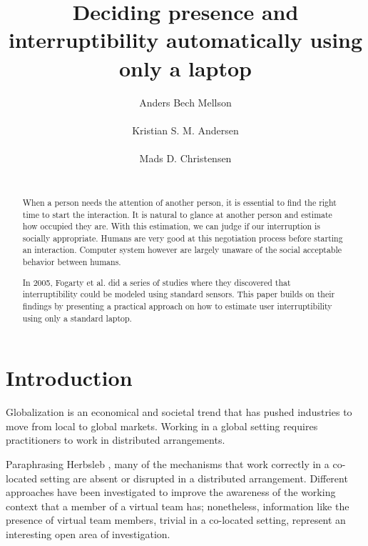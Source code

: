 \documentclass{sigchi}
\begin{document}
\title{Deciding presence and interruptibility automatically using only a laptop}
\author{
  \alignauthor Anders Bech Mellson\\
    \\
  \alignauthor Kristian S. M. Andersen\\
    \\
  \alignauthor Mads D. Christensen\\
    \\
}

\maketitle

\begin{abstract}
When a person needs the attention of another person, it is essential to find the right time to start the interaction.
It is natural to glance at another person and estimate how occupied they are. With this estimation, we can judge if our interruption is socially appropriate.
Humans are very good at this negotiation process before starting an interaction.
Computer system however are largely unaware of the social acceptable behavior between humans.

In 2005, Fogarty et al. did a series of studies where they discovered that interruptibility could be modeled using standard sensors.
This paper builds on their findings by presenting a practical approach on how to estimate user interruptibility using only a standard laptop.

\end{abstract}



\section{Introduction}
Globalization is an economical and societal trend that has pushed industries to move from local to global markets.
Working in a global setting requires practitioners to work in distributed arrangements.

Paraphrasing Herbsleb \cite{herbsleb2007}, many of the mechanisms that work correctly in a co-located setting are absent or disrupted in a distributed arrangement.
Different approaches \cite{bly1993media} \cite{fogarty2004myvine} \cite{hincapie2011design} \cite{lai2003myteam} \cite{want1992active} have been investigated to improve the awareness of the working context that a member of a virtual team has; nonetheless, information like the presence of virtual team members, trivial in a co-located setting, represent an interesting open area of investigation.
\end{document}
